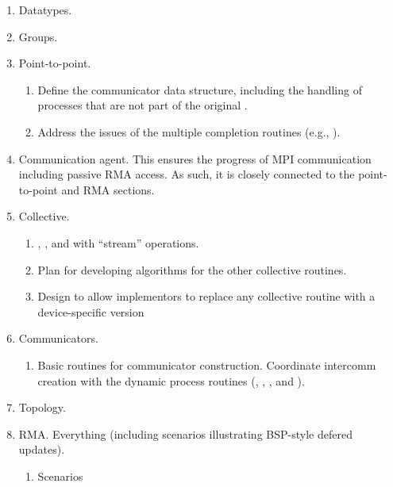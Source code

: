 \documentclass{article}
\begin{document}
\begin{enumerate}
\begin{enumerate}
  \item Datatypes.
  \item Groups.
  \item Point-to-point.  
    \begin{enumerate}
    \item Define the communicator data structure, including the handling
      of processes that are not part of the original
      .
    \item Address the issues of the multiple completion routines (e.g.,
      ). 
    \end{enumerate}
  \item Communication agent. 
    This ensures the progress of MPI communication including passive RMA
    access.  As such, it is closely connected to the point-to-point and RMA
    sections.  
  \item Collective.  
    \begin{enumerate}
    \item {}, , and 
      with ``stream'' operations.
    \item Plan for developing algorithms for the other collective routines.
    \item Design to allow implementors to replace any collective routine with
      a device-specific version
    \end{enumerate}
  \item Communicators.
    \begin{enumerate}
    \item Basic routines for communicator construction.  Coordinate intercomm
      creation with the dynamic process routines (,
      , , and
      ).  
    \end{enumerate}
  \item Topology.
  \item RMA.  Everything (including scenarios illustrating BSP-style defered
    updates).  
  \begin{enumerate}
    \item Scenarios
  \end{enumerate}

\end{enumerate}
\end{enumerate}
\end{document}
